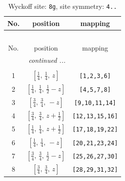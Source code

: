 \documentclass[fleqn,8pt]{jsarticle}
\begin{document}
\begin{longtable}{ccc}
\caption{Wyckoff site: {\tt 8g}, site symmetry: {\tt 4..}}
 \\
 \hline \hline
No. & position & mapping \\ \hline \endfirsthead

\multicolumn{2}{l}{\tablename\ \thetable{}} \\
 \hline \hline
No. & position & mapping \\ \hline \endhead

 \hline \hline
\multicolumn{2}{r}{\footnotesize\it continued ...} \\ \endfoot

 \hline \hline
\multicolumn{2}{r}{} \\ \endlastfoot

1 & $\left[ \frac{1}{4},\, \frac{1}{4},\, z \right]$ & {\tt [1,2,3,6]} \\ \hline
2 & $\left[ \frac{1}{4},\, \frac{1}{4},\, \frac{1}{2} - z \right]$ & {\tt [4,5,7,8]} \\ \hline
3 & $\left[ \frac{3}{4},\, \frac{3}{4},\, - z \right]$ & {\tt [9,10,11,14]} \\ \hline
4 & $\left[ \frac{3}{4},\, \frac{3}{4},\, z + \frac{1}{2} \right]$ & {\tt [12,13,15,16]} \\ \hline
5 & $\left[ \frac{1}{4},\, \frac{1}{4},\, z + \frac{1}{2} \right]$ & {\tt [17,18,19,22]} \\ \hline
6 & $\left[ \frac{1}{4},\, \frac{1}{4},\, - z \right]$ & {\tt [20,21,23,24]} \\ \hline
7 & $\left[ \frac{3}{4},\, \frac{3}{4},\, \frac{1}{2} - z \right]$ & {\tt [25,26,27,30]} \\ \hline
8 & $\left[ \frac{3}{4},\, \frac{3}{4},\, z \right]$ & {\tt [28,29,31,32]} \\
\end{longtable}
\renewcommand{\arraystretch}{1.2}
\end{document}
